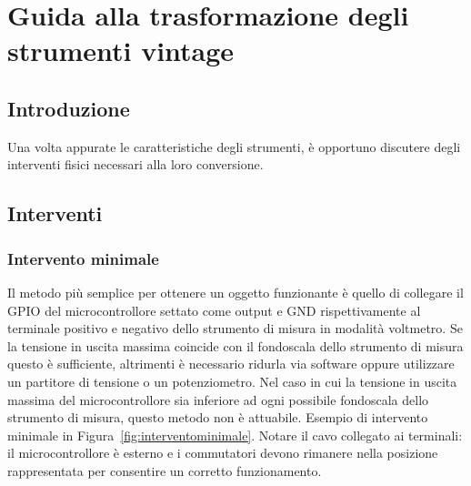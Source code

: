 \documentclass[12pt,a4paper]{report}
\begin{document}
\chapter{Guida alla trasformazione degli strumenti vintage}




\section{Introduzione}
Una volta appurate le caratteristiche degli strumenti, è opportuno discutere degli interventi fisici necessari alla loro conversione.


\section{Interventi}
\subsection{Intervento minimale}
Il metodo più semplice per ottenere un oggetto funzionante è quello di collegare il GPIO del microcontrollore settato come output
e GND rispettivamente al terminale positivo e negativo dello strumento di misura in modalità voltmetro. Se la tensione in uscita massima
coincide con il fondoscala dello strumento di misura questo è sufficiente, altrimenti è necessario ridurla via software oppure
utilizzare un partitore di tensione o un potenziometro. Nel caso in cui la tensione in uscita massima del microcontrollore sia inferiore
ad ogni possibile fondoscala dello strumento di misura, questo metodo non è attuabile. Esempio di intervento minimale in
Figura~\ref{fig:interventominimale}. Notare il cavo collegato ai terminali: il microcontrollore è esterno
e i commutatori devono rimanere nella posizione rappresentata per consentire un corretto funzionamento.
\end{document}
